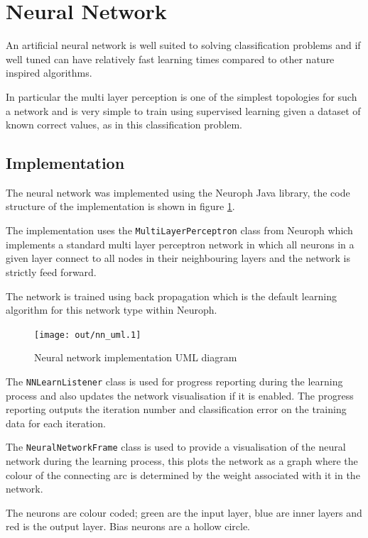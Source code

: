 \documentclass[a4paper]{article}
\begin{document}
\section{Neural Network}
\label{sec:nn}

An artificial neural network is well suited to solving classification problems
and if well tuned can have relatively fast learning times compared to other
nature inspired algorithms.

In particular the multi layer perception is one of the simplest topologies for
such a network and is very simple to train using supervised learning given a
dataset of known correct values, as in this classification problem.

\subsection{Implementation}
\label{sec:nn_implementation}

The neural network was implemented using the Neuroph \cite{neuroph} Java
library, the code structure of the implementation is shown in figure
\ref{fig:nn_uml}.

The implementation uses the \texttt{MultiLayerPerceptron} class from Neuroph
which implements a standard multi layer perceptron network in which all neurons
in a given layer connect to all nodes in their neighbouring layers and the
network is strictly feed forward.

The network is trained using back propagation which is the default learning
algorithm for this network type within Neuroph.

\begin{figure}[h!]
  \centering
  \texttt{[image: out/nn\_uml.1]}
  \caption{Neural network implementation UML diagram}
  \label{fig:nn_uml}
\end{figure}

The \texttt{NNLearnListener} class is used for progress reporting during the
learning process and also updates the network visualisation if it is enabled.
The progress reporting outputs the iteration number and classification error on
the training data for each iteration.

The \texttt{NeuralNetworkFrame} class is used to provide a visualisation of the
neural network during the learning process, this plots the network as a graph
where the colour of the connecting arc is determined by the weight associated
with it in the network.

The neurons are colour coded; green are the input layer, blue are inner layers
and red is the output layer. Bias neurons are a hollow circle.
\end{document}
